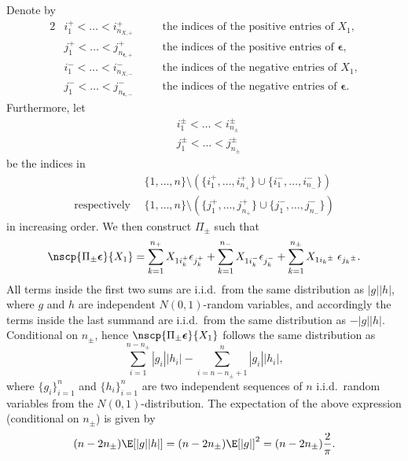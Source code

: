 \documentclass[11pt]{article}
\def\eps{\boldsymbol{\epsilon}}
\begin{document}
Denote by 
\begin{alignat*}{2}
&i_1^+ < \ldots < i_{n_{X,+}}^+ \quad &&\text{the indices of the positive entries of $X_1$},\\
&j_1^+ < \ldots < j_{n_{\eps,+}}^+ \quad &&\text{the indices of the positive entries of $\eps$},\\
&i_1^- < \ldots < i_{n_{X,-}}^- \quad &&\text{the indices of the negative entries of $X_1$},\\
&j_1^- < \ldots < j_{n_{\eps,-}}^- \quad &&\text{the indices of the negative entries of $\eps$}.
\end{alignat*}
Furthermore, let 
\begin{align*}
&i_{1}^{\pm} < \ldots < i_{n_{\pm}}^{\pm} \\
&j_{1}^{\pm} < \ldots < j_{n_{\pm}}^{\pm} 
\end{align*}
be the indices in 
\begin{align*}
                    & \{1,\ldots,n\} \setminus (\{i_1^+,\ldots, i_{n_+}^+\} \cup \{i_1^-,\ldots, i_{n_-}^-\}) \\
\text{respectively}\;\, & \{1,\ldots,n\} \setminus (\{j_1^+,\ldots, j_{n_+}^+\} \cup \{j_1^-,\ldots, j_{n_-}^-\})
\end{align*}
in increasing order. We then construct $\Pi_{\pm}$ such that 
\begin{equation*}
\nscp{\Pi_{\pm} \eps}{X_1} = \sum_{k = 1}^{n_+} X_{1{i_k^+}} \epsilon_{j_k^+} + 
\sum_{k = 1}^{n_-} X_{1{i_k^-}} \epsilon_{j_k^-} + \sum_{k = 1}^{n_{\pm}} X_{1{i_k}^{\pm}} \; \epsilon_{{j_k}^{\pm}}. 
\end{equation*}
All terms inside the first two sums are i.i.d.~from the same distribution as $|g| |h|$, where $g$ and $h$ are independent
$N(0,1)$-random variables, and accordingly the terms inside the last summand are i.i.d.~from the same distribution as
$-|g||h|$. Conditional on $n_{\pm}$,  hence $\nscp{\Pi_{\pm} \eps}{X_1}$ follows the same distribution as 
\begin{equation*}
\sum_{i = 1}^{n - n_{\pm}} |g_i| |h_i|  - \sum_{i=n - n_{\pm} + 1}^{n} |g_i| |h_i|,
\end{equation*}
where $\{ g_i \}_{i = 1}^n$ and $\{ h_i \}_{i = 1}^n$ are two independent sequences of $n$ i.i.d.~random variables from the $N(0,1)$-distribution. The expectation of the above expression (conditional on $n_{\pm}$)
is given by 
\begin{equation*}
(n - 2 n_{\pm}) \E[|g||h|] = (n - 2 n_{\pm}) \E[|g|]^2 = (n - 2 n_{\pm}) \frac{2}{\pi}. 
\end{equation*}
\end{document}
